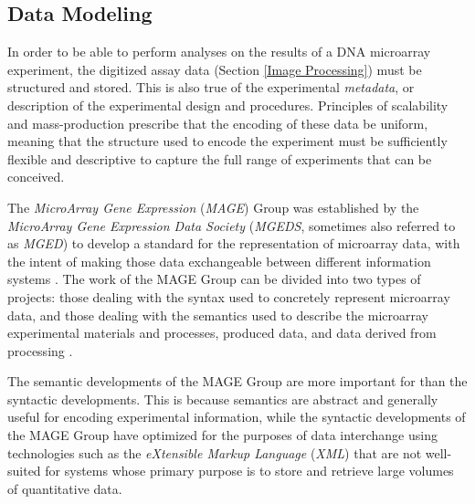 \subsection{Data Modeling}\label{Data Modeling}

In order to be able to perform analyses on the results of a DNA microarray
experiment, the digitized assay data (Section \ref{Image Processing}) must be
structured and stored.  This is also true of the experimental \emph{metadata},
or description of the experimental design and procedures.  Principles of
scalability and mass-production prescribe that the encoding of these data be
uniform, meaning that the structure used to encode the experiment must be
sufficiently flexible and descriptive to capture the full range of experiments
that can be conceived.

The \emph{MicroArray Gene Expression} (\emph{MAGE}) Group was established by
the \emph{MicroArray Gene Expression Data Society} (\emph{MGEDS}, sometimes
also referred to as \emph{MGED}) to develop a standard for the representation
of microarray data, with the intent of making those data exchangeable between
different information systems \cite{mged}.  The work of the MAGE Group can be
divided into two types of projects: those dealing with the syntax used to
concretely represent microarray data, and those dealing with the semantics used
to describe the microarray experimental materials and processes, produced data,
and data derived from processing \cite{miame, mage, mo}.

The semantic developments of the MAGE Group \cite{mage} are more important for
\dbthesis than the syntactic developments.  This is because semantics are
abstract and generally useful for encoding experimental information, while the
syntactic developments of the MAGE Group have optimized for the purposes of
data interchange using technologies such as the \emph{eXtensible Markup
Language} (\emph{XML}) that are not well-suited for systems whose primary
purpose is to store and retrieve large volumes of quantitative data.

